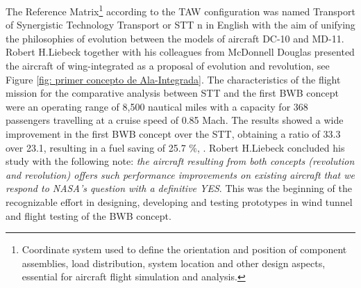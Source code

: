 The Reference Matrix\footnote{Coordinate system used to define the orientation and position of component assemblies, load distribution, system location and other design aspects, essential for aircraft flight simulation and analysis.} according to the TAW configuration was named Transport of Synergistic Technology Transport or STT n in English with the aim of unifying the philosophies of evolution between the models of aircraft DC-10 and MD-11. Robert H.Liebeck together with his colleagues from McDonnell Douglas presented the aircraft of wing-integrated as a proposal of evolution and revolution, see Figure \ref{fig: primer concepto de Ala-Integrada}. The characteristics of the flight mission for the comparative analysis between STT and the first BWB concept were an operating range of 8,500 nautical miles with a capacity for 368 passengers travelling at a cruise speed of 0.85 Mach. The results showed a wide improvement in the first BWB concept over the STT, obtaining a ratio of 33.3 over 23.1, resulting in a fuel saving of 25.7 $\%$, \cite{Larrimer2020}.
%
Robert H.Liebeck concluded his study with the following note: \textit{the aircraft resulting from both concepts (revolution and revolution) offers such performance improvements on existing aircraft that we respond to NASA's question with a definitive YES}.
%
This was the beginning of the recognizable effort in designing, developing and testing prototypes in wind tunnel and flight testing of the BWB concept.


%
%


